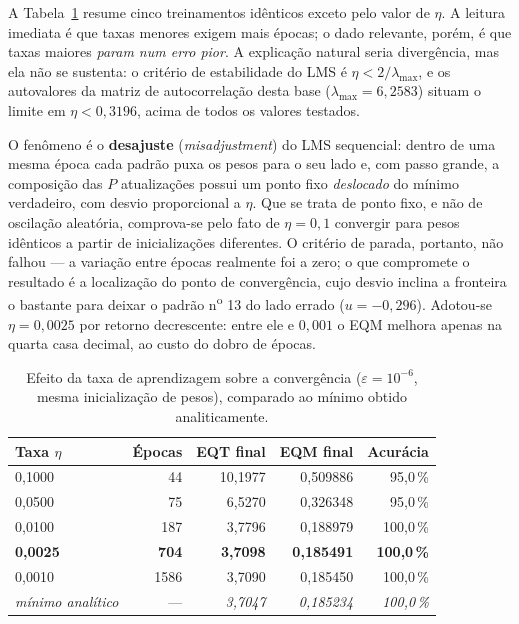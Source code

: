 \documentclass[12pt,a4paper]{article}
\begin{document}
A Tabela~\ref{tab:eta} resume cinco treinamentos id\^enticos exceto pelo valor de
$\eta$. A leitura imediata \'e que taxas menores exigem mais \'epocas; o dado
relevante, por\'em, \'e que taxas maiores \emph{param num erro pior}. A
explica\c{c}\~ao natural seria diverg\^encia, mas ela n\~ao se sustenta: o
crit\'erio de estabilidade do LMS \'e $\eta < 2/\lambda_{\max}$, e os autovalores da
matriz de autocorrela\c{c}\~ao desta base ($\lambda_{\max} = 6{,}2583$) situam o
limite em $\eta < 0{,}3196$, acima de todos os valores testados.

O fen\^omeno \'e o \textbf{desajuste} (\textit{misadjustment}) do LMS sequencial:
dentro de uma mesma \'epoca cada padr\~ao puxa os pesos para o seu lado e, com
passo grande, a composi\c{c}\~ao das $P$ atualiza\c{c}\~oes possui um ponto fixo
\emph{deslocado} do m\'inimo verdadeiro, com desvio proporcional a $\eta$. Que se
trata de ponto fixo, e n\~ao de oscila\c{c}\~ao aleat\'oria, comprova-se pelo fato
de $\eta = 0{,}1$ convergir para pesos id\^enticos a partir de inicializa\c{c}\~oes
diferentes. O crit\'erio de parada, portanto, n\~ao falhou --- a varia\c{c}\~ao
entre \'epocas realmente foi a zero; o que compromete o resultado \'e a
localiza\c{c}\~ao do ponto de converg\^encia, cujo desvio inclina a fronteira o
bastante para deixar o padr\~ao n\textsuperscript{o} 13 do lado errado
($u = -0{,}296$). Adotou-se $\eta = 0{,}0025$ por retorno decrescente: entre ele e
$0{,}001$ o EQM melhora apenas na quarta casa decimal, ao custo do dobro de
\'epocas.

\begin{table}[H]
\centering
\caption{Efeito da taxa de aprendizagem sobre a converg\^encia
($\varepsilon = 10^{-6}$, mesma inicializa\c{c}\~ao de pesos), comparado ao
m\'inimo obtido analiticamente.}
\label{tab:eta}
{\small\singlespacing
\begin{tabular}{@{}lrrrr@{}}
\toprule
\textbf{Taxa $\eta$} & \textbf{\'Epocas} & \textbf{EQT final} & \textbf{EQM final}
& \textbf{Acur\'acia} \\
\midrule
0,1000 & 44 & 10,1977 & 0,509886 & 95,0\,\% \\
0,0500 & 75 & 6,5270 & 0,326348 & 95,0\,\% \\
0,0100 & 187 & 3,7796 & 0,188979 & 100,0\,\% \\
\textbf{0,0025} & \textbf{704} & \textbf{3,7098} & \textbf{0,185491} & \textbf{100,0\,\%} \\
0,0010 & 1586 & 3,7090 & 0,185450 & 100,0\,\% \\
\midrule
\textit{m\'inimo anal\'itico} & --- & \textit{3,7047} & \textit{0,185234} & \textit{100,0\,\%} \\
\bottomrule
\end{tabular}}
\end{table}
\end{document}
